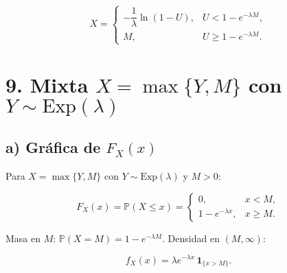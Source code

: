 \documentclass[10pt,a4paper]{article}
\begin{document}
\[
X=\begin{cases}
-\dfrac{1}{\lambda}\ln(1-U),&U<1-e^{-\lambda M},\\[6pt]
M,&U\ge 1-e^{-\lambda M}.
\end{cases}
\]

    \hypertarget{mixta-xmaxym-con-ysimmathrmexplambda}{%
\section{\texorpdfstring{9. Mixta \(X=\max\{Y,M\}\) con
\(Y\sim\mathrm{Exp}(\lambda)\)}{9. Mixta X=\textbackslash max\textbackslash\{Y,M\textbackslash\} con Y\textbackslash sim\textbackslash mathrm\{Exp\}(\textbackslash lambda)}}\label{mixta-xmaxym-con-ysimmathrmexplambda}}

    \hypertarget{a-gruxe1fica-de-f_xx}{%
\subsection{\texorpdfstring{a) Gráfica de
\(F_X(x)\)}{a) Gráfica de F\_X(x)}}\label{a-gruxe1fica-de-f_xx}}

    Para \(X=\max\{Y,M\}\) con \(Y\sim\mathrm{Exp}(\lambda)\) y \(M>0\):

\[
F_X(x)=\mathbb P(X\le x)=
\begin{cases}
0,& x<M,\\[4pt]
1-e^{-\lambda x},& x\ge M.
\end{cases}
\]

Masa en \(M\): \(\mathbb P(X=M)=1-e^{-\lambda M}\). Densidad en
\((M,\infty)\):

\[
f_X(x)=\lambda e^{-\lambda x}\,\mathbf 1_{\{x>M\}}.
\]
\end{document}
